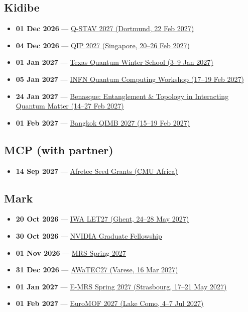 \subsection*{Kidibe}
\begin{itemize}[leftmargin=1.4em,itemsep=0.1em]
  \item \textbf{01 Dec 2026} --- \href{https://www.spp2514.kit.edu/Q-STAV_2027.php}{Q-STAV 2027 (Dortmund, 22 Feb 2027)}
  \item \textbf{04 Dec 2026} --- \href{https://qipconference.org/2027/call/}{QIP 2027 (Singapore, 20--26 Feb 2027)}
  \item \textbf{01 Jan 2027} --- \href{https://www.texquantum.com/index.html}{Texas Quantum Winter School (3--9 Jan 2027)}
  \item \textbf{05 Jan 2027} --- \href{https://agenda.infn.it/event/53380/abstracts/}{INFN Quantum Computing Workshop (17--19 Feb 2027)}
  \item \textbf{24 Jan 2027} --- \href{https://www.benasque.org/2027etqm/}{Benasque: Entanglement \& Topology in Interacting Quantum Matter (14--27 Feb 2027)}
  \item \textbf{01 Feb 2027} --- \href{https://www.thaihep.phys.sc.chula.ac.th/BKK2027QIMB/}{Bangkok QIMB 2027 (15--19 Feb 2027)}
\end{itemize}

\subsection*{MCP (with partner)}
\begin{itemize}[leftmargin=1.4em,itemsep=0.1em]
  \item \textbf{14 Sep 2027} --- \href{https://engineering.cmu.edu/afretec/funding-opportunities/index.html}{Afretec Seed Grants (CMU Africa)}
\end{itemize}

\subsection*{Mark}
\begin{itemize}[leftmargin=1.4em,itemsep=0.1em]
  \item \textbf{20 Oct 2026} --- \href{https://ebnet.ac.uk/iwa-let27-abstracts-deadline/}{IWA LET27 (Ghent, 24--28 May 2027)}
  \item \textbf{30 Oct 2026} --- \href{https://research.nvidia.com/graduate-fellowships}{NVIDIA Graduate Fellowship}
  \item \textbf{01 Nov 2026} --- \href{https://www.mrs.org/docs/default-source/meetings-events/spring-meetings/2027/s27-call-for-abstracts.pdf}{MRS Spring 2027}
  \item \textbf{31 Dec 2026} --- \href{https://awatec27.dista.uninsubria.it/}{AWaTEC27 (Varese, 16 Mar 2027)}
  \item \textbf{01 Jan 2027} --- \href{https://www.european-mrs.com/meetings/2027-spring-meeting-exhibit}{E-MRS Spring 2027 (Strasbourg, 17--21 May 2027)}
  \item \textbf{01 Feb 2027} --- \href{https://euromof2027.com/}{EuroMOF 2027 (Lake Como, 4--7 Jul 2027)}
\end{itemize}

